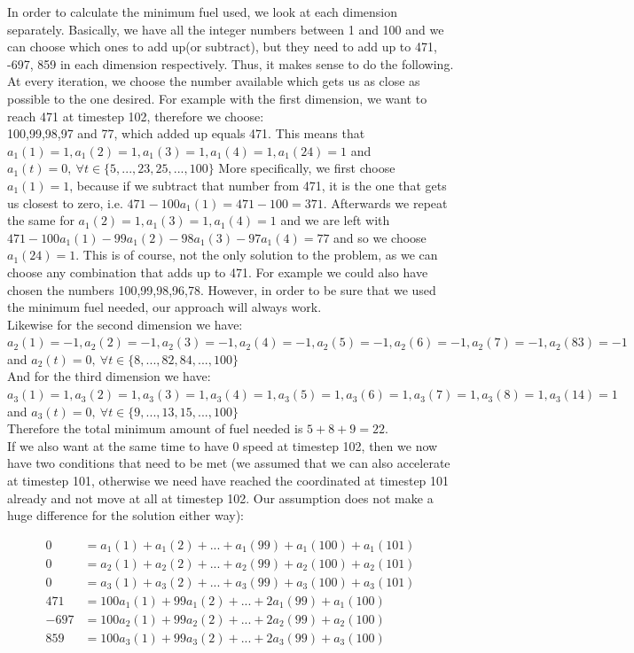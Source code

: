 \documentclass[11pt,a4paper,oneside]{report}
\begin{document}
In order to calculate the minimum fuel used, we look at each dimension separately. Basically, we have all the integer numbers between 1 and 100 and we can choose which ones to add up(or subtract), but they need to add up to 471, -697, 859 in each dimension respectively. Thus, it makes sense to do the following. At every iteration, we choose the number available which gets us as close as possible to the one desired. For example with the first dimension, we want to reach 471 at timestep 102, therefore we choose:\\
100,99,98,97 and 77, which added up equals 471. This means that $a_1(1)=1, a_1(2)=1, a_1(3)=1,a_1(4)=1,a_1(24)=1$ and $a_1(t) = 0,\ \forall t \in \{5,...,23,25,...,100\}$
More specifically, we first choose $a_1(1) = 1$, because if we subtract that number from 471, it is the one that gets us closest to zero, i.e. $471-100a_1(1) = 471-100=371$. Afterwards we repeat the same for $a_1(2)=1, a_1(3)=1,a_1(4)=1$ and we are left with $471-100a_1(1)-99a_1(2)-98a_1(3)-97a_1(4)=77$ and so we choose $a_1(24)=1$. This is of course, not the only solution to the problem, as we can choose any combination that adds up to 471. For example we could also have chosen the numbers 100,99,98,96,78. However, in order to be sure that we used the minimum fuel needed, our approach will always work.\\
Likewise for the second dimension we have:\\
$a_2(1)=-1,a_2(2)=-1,a_2(3)=-1,a_2(4)=-1,a_2(5)=-1,a_2(6)=-1,a_2(7)=-1,a_2(83)=-1$ and $a_2(t)=0,\ \forall t\in \{8,...,82,84,...,100\}$\\
And for the third dimension we have:\\
$a_3(1)=1,a_3(2)=1,a_3(3)=1,a_3(4)=1,a_3(5)=1,a_3(6)=1,a_3(7)=1,a_3(8)=1,a_3(14)=1$ and $a_3(t)=0,\ \forall t\in \{9,...,13,15,...,100\}$\\

Therefore the total minimum amount of fuel needed is $5+8+9=22$.\\

If we also want at the same time to have 0 speed at timestep 102, then we now have two conditions that need to be met (we assumed that we can also accelerate at timestep 101, otherwise we need have reached the coordinated at timestep 101 already and not move at all at timestep 102. Our assumption does not make a huge difference for the solution either way):

\begin{align*}
0 &= a_1(1)+a_1(2)+...+a_1(99)+a_1(100)+a_1(101)\\
0 &= a_2(1)+a_2(2)+...+a_2(99)+a_2(100)+a_2(101)\\
0 &= a_3(1)+a_3(2)+...+a_3(99)+a_3(100)+a_3(101)\\
471 &= 100a_1(1)+99a_1(2)+...+2a_1(99)+a_1(100)\\
-697 &= 100a_2(1)+99a_2(2)+...+2a_2(99)+a_2(100)\\
859 &= 100a_3(1)+99a_3(2)+...+2a_3(99)+a_3(100)\\
\end{align*}
\end{document}

